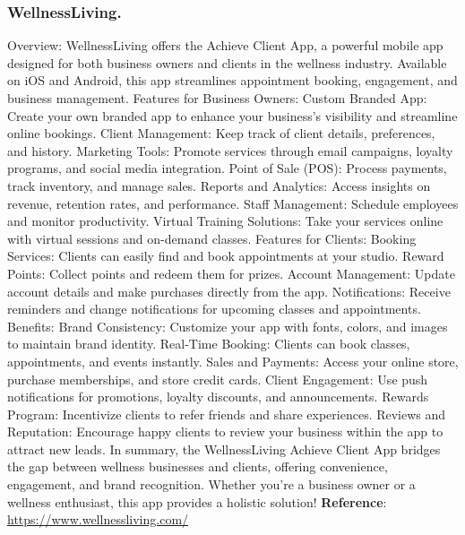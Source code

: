 \documentclass{article}
\begin{document}
      \subsubsection{WellnessLiving.}
      Overview:
      WellnessLiving offers the Achieve Client App, a powerful mobile app designed for both business owners and clients in the wellness industry.
      Available on iOS and Android, this app streamlines appointment booking, engagement, and business management.
      Features for Business Owners:
      Custom Branded App: Create your own branded app to enhance your business’s visibility and streamline online bookings.
      Client Management: Keep track of client details, preferences, and history.
      Marketing Tools: Promote services through email campaigns, loyalty programs, and social media integration.
      Point of Sale (POS): Process payments, track inventory, and manage sales.
      Reports and Analytics: Access insights on revenue, retention rates, and performance.
      Staff Management: Schedule employees and monitor productivity.
      Virtual Training Solutions: Take your services online with virtual sessions and on-demand classes.
      Features for Clients:
      Booking Services: Clients can easily find and book appointments at your studio.
      Reward Points: Collect points and redeem them for prizes.
      Account Management: Update account details and make purchases directly from the app.
      Notifications: Receive reminders and change notifications for upcoming classes and appointments.
      Benefits:
      Brand Consistency: Customize your app with fonts, colors, and images to maintain brand identity.
      Real-Time Booking: Clients can book classes, appointments, and events instantly.
      Sales and Payments: Access your online store, purchase memberships, and store credit cards.
      Client Engagement: Use push notifications for promotions, loyalty discounts, and announcements.
      Rewards Program: Incentivize clients to refer friends and share experiences.
      Reviews and Reputation:
      Encourage happy clients to review your business within the app to attract new leads.
      In summary, the WellnessLiving Achieve Client App bridges the gap between wellness businesses and clients, offering convenience, engagement, and brand recognition. Whether you’re a business owner or a wellness enthusiast, this app provides a holistic solution!\newline
      \textbf{Reference}: \href{https://www.wellnessliving.com/}{https://www.wellnessliving.com/}
\end{document}
